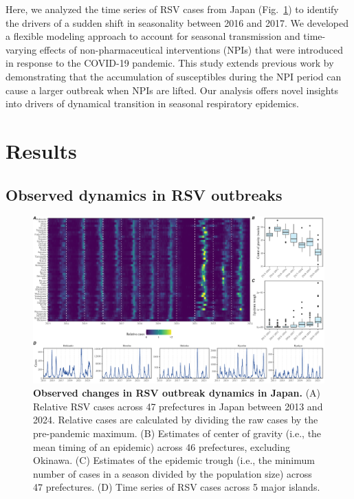 \documentclass[12pt]{article}
\newcommand{\fref}[1]{Fig.~\ref{fig:#1}}
\begin{document}
Here, we analyzed the time series of RSV cases from Japan (\fref{fig1}) to identify the drivers of a sudden shift in seasonality between 2016 and 2017. We developed a flexible modeling approach to account for seasonal transmission and time-varying effects of non-pharmaceutical interventions (NPIs) that were introduced in response to the COVID-19 pandemic. This study extends previous work by \cite{baker2020impact} demonstrating that the accumulation of susceptibles during the NPI period can cause a larger outbreak when NPIs are lifted.
Our analysis offers novel insights into drivers of dynamical transition in seasonal respiratory epidemics.

\section*{Results}

\subsection*{Observed dynamics in RSV outbreaks}

\begin{figure}[!th]
\includegraphics[width=\textwidth]{../figure/figure1.pdf}
\caption{
\textbf{Observed changes in RSV outbreak dynamics in Japan.}
(A) Relative RSV cases across 47 prefectures in Japan between 2013 and 2024.
Relative cases are calculated by dividing the raw cases by the pre-pandemic maximum.
(B) Estimates of center of gravity (i.e., the mean timing of an epidemic) across 46 prefectures, excluding Okinawa.
(C) Estimates of the epidemic trough (i.e., the minimum number of cases in a season divided by the population size) across 47 prefectures.
(D) Time series of RSV cases across 5 major islands.
}
\label{fig:fig1}
\end{figure}
\end{document}
